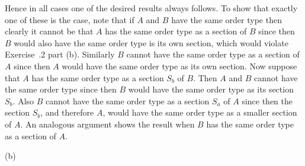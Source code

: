 {{    Hence in all cases one of the desired results always follows.
    To show that exactly one of these is the case, note that if $A$ and $B$ have the same order type then clearly it cannot be that $A$ has the same order type as a section of $B$ since then $B$ would also have the same order type is its own section, which would violate Exercise~\secl.2 part (b).
    Similarly $B$ cannot have the same order type as a section of $A$ since then $A$ would have the same order type as its own section.
    Now suppose that $A$ has the same order type as a section $S_b$ of $B$.
    Then $A$ and $B$ cannot have the same order type since then $B$ would have the same order type as its section $S_b$.
    Also $B$ cannot have the same order type as a section $S_a$ of $A$ since then the section $S_b$, and therefore $A$, would have the same order type as a smaller section of $A$.
    An analogous argument shows the result when $B$ has the same order type as a section of $A$.
  }

  (b)
}

